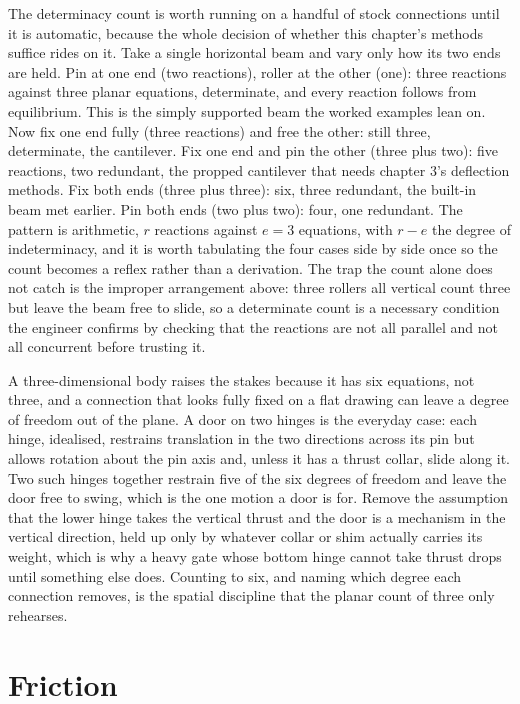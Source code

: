 The determinacy count is worth running on a handful of stock connections until
it is automatic, because the whole decision of whether this chapter's methods
suffice rides on it. Take a single horizontal beam and vary only how its two
ends are held. Pin at one end (two reactions), roller at the other (one): three
reactions against three planar equations, determinate, and every reaction
follows from equilibrium. This is the simply supported beam the worked examples
lean on. Now fix one end fully (three reactions) and free the other: still
three, determinate, the cantilever. Fix one end and pin the other (three plus
two): five reactions, two redundant, the propped cantilever that needs
chapter 3's deflection methods. Fix both ends (three plus three): six, three
redundant, the built-in beam met earlier. Pin both ends (two plus two): four,
one redundant. The pattern is arithmetic, $r$ reactions against $e = 3$
equations, with $r - e$ the degree of indeterminacy, and it is worth tabulating
the four cases side by side once so the count becomes a reflex rather than a
derivation. The trap the count alone does not catch is the improper arrangement
above: three rollers all vertical count three but leave the beam free to slide,
so a determinate count is a necessary condition the engineer confirms by
checking that the reactions are not all parallel and not all concurrent before
trusting it.

A three-dimensional body raises the stakes because it has six equations, not
three, and a connection that looks fully fixed on a flat drawing can leave a
degree of freedom out of the plane. A door on two hinges is the everyday case:
each hinge, idealised, restrains translation in the two directions across its
pin but allows rotation about the pin axis and, unless it has a thrust collar,
slide along it. Two such hinges together restrain five of the six degrees of
freedom and leave the door free to swing, which is the one motion a door is for.
Remove the assumption that the lower hinge takes the vertical thrust and the
door is a mechanism in the vertical direction, held up only by whatever collar
or shim actually carries its weight, which is why a heavy gate whose bottom
hinge cannot take thrust drops until something else does. Counting to six, and
naming which degree each connection removes, is the spatial discipline that the
planar count of three only rehearses.

\section{Friction}

